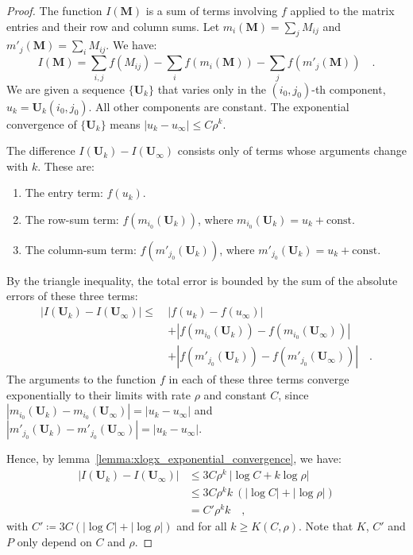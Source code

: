 \documentclass[../../main.tex]{subfiles}
\begin{document}
\begin{proof}
The function $I(\bm{M})$ is a sum of terms involving $f$ applied to the matrix entries and their row and column sums. Let $m_i(\bm{M}) = \sum_j M_{ij}$ and $m'_j(\bm{M}) = \sum_i M_{ij}$. We have:
\[
    I(\bm{M}) = \sum_{i,j} f(M_{ij}) - \sum_i f(m_i(\bm{M})) - \sum_j f(m'_j(\bm{M})) \quad .
\]
We are given a sequence $\{\bm{U}_k\}$ that varies only in the $(i_0, j_0)$-th component, $u_k = \bm{U}_k(i_0, j_0)$. All other components are constant. The exponential convergence of $\{\bm{U}_k\}$ means $|u_k - u_\infty| \le C \rho^k$.

\clearpage
The difference $I(\bm{U}_k) - I(\bm{U}_\infty)$ consists only of terms whose arguments change with $k$. These are:
\begin{enumerate}
    \item The entry term: $f(u_k)$.
    \item The row-sum term: $f(m_{i_0}(\bm{U}_k))$, where $m_{i_0}(\bm{U}_k) = u_k + \text{const}$.
    \item The column-sum term: $f(m'_{j_0}(\bm{U}_k))$, where $m'_{j_0}(\bm{U}_k) = u_k + \text{const}$.
\end{enumerate}
By the triangle inequality, the total error is bounded by the sum of the absolute errors of these three terms:
\begin{align*}
|I(\bm{U}_k) - I(\bm{U}_\infty)| \le \ & |f(u_k) - f(u_\infty)| \\
& + |f(m_{i_0}(\bm{U}_k)) - f(m_{i_0}(\bm{U}_\infty))| \\
& + |f(m'_{j_0}(\bm{U}_k)) - f(m'_{j_0}(\bm{U}_\infty))| \quad .
\end{align*}
The arguments to the function $f$ in each of these three terms converge exponentially to their limits with rate $\rho$ and constant $C$, since $|m_{i_0}(\bm{U}_k) - m_{i_0}(\bm{U}_\infty)| = |u_k - u_\infty|$ and $|m'_{j_0}(\bm{U}_k) - m'_{j_0}(\bm{U}_\infty)| = |u_k - u_\infty|$.

Hence, by lemma~\ref{lemma:xlogx_exponential_convergence}, we have:
\begin{align*}
|I(\bm{U}_k) - I(\bm{U}_\infty)| &\leq 3 C \rho^k \ |\log C + k \log \rho| \\
&\leq 3 C \rho^k k \ (|\log C| + |\log \rho|) \\
&= C' \rho^k k \quad ,
\end{align*}
with $C' \coloneqq 3 C (|\log C| + |\log \rho|)$ and for all $k \geq K(C, \rho)$. Note that $K$, $C'$ and $P$ only depend on $C$ and $\rho$.
\end{proof}
\end{document}
